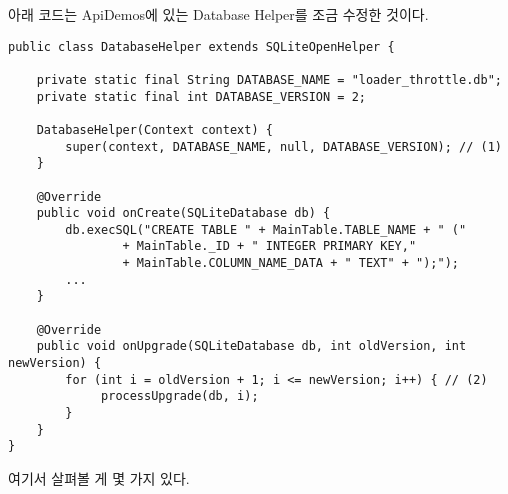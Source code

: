 아래 코드는 ApiDemos에 있는 Database Helper를 조금 수정한 것이다.
\begin{lstlisting}[frame=single] 
public class DatabaseHelper extends SQLiteOpenHelper {

	private static final String DATABASE_NAME = "loader_throttle.db";
	private static final int DATABASE_VERSION = 2;

	DatabaseHelper(Context context) {
		super(context, DATABASE_NAME, null, DATABASE_VERSION); // (1)
	}

	@Override
	public void onCreate(SQLiteDatabase db) {
		db.execSQL("CREATE TABLE " + MainTable.TABLE_NAME + " ("
				+ MainTable._ID + " INTEGER PRIMARY KEY,"
				+ MainTable.COLUMN_NAME_DATA + " TEXT" + ");");
		...
	}

	@Override
	public void onUpgrade(SQLiteDatabase db, int oldVersion, int newVersion) {
		for (int i = oldVersion + 1; i <= newVersion; i++) { // (2)
			 processUpgrade(db, i);
		}
	}
}
\end{lstlisting}
여기서 살펴볼 게 몇 가지 있다.

